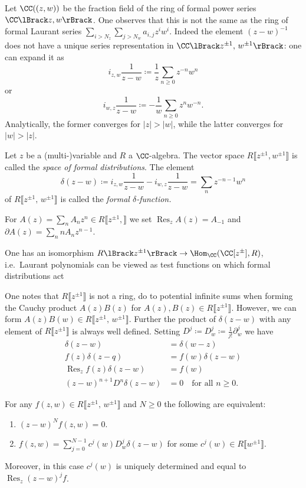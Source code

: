 \documentclass{ck-article}
\DeclareMathOperator\Res{Res}
\renewcommand\lParen{((}
\renewcommand\rParen{))}
\begin{document}
Let $\CC\lParen z,w\rParen$ be the fraction field of the ring of formal power series $\CC\lBrack z,w \rBrack$.
One observes that this is not the same as the ring of formal Laurant series $\sum_{i > N_z}\sum_{j > N_w} a_{i,j} z^iw^i$.
Indeed the element $(z-w)^{-1}$ does not have a unique series representation in $\CC\lBrack z^{\pm1},\, w^{\pm1}\rBrack$: one can expand it as
\[
    i_{z,w}\frac{1}{z-w} \coloneqq \frac1z\sum_{n \ge 0} z^{-n}w^n
\]
or
\[
    i_{w,z}\frac{1}{z-w} \coloneqq -\frac1w\sum_{n \ge 0} z^{n}w^{-n}.
\]
Analytically, the former converges for $|z| > |w|$, while the latter converges for $|w| > |z|$.

\begin{Definition}
    Let $z$ be a (multi-)variable and $R$ a $\CC$-algebra.
    The vector space $R\lBrack z^{\pm1}, w^{\pm1}\rBrack$ is called the \emph{space of formal distributions}.
    The element 
    \[
        \delta(z-w) \coloneqq i_{z,w}\frac{1}{z-w} - i_{w,z}\frac{1}{z-w} = \sum_n z^{-n-1} w^n
    \]
    of 
    $R\lBrack z^{\pm1},\, w^{\pm1}\rBrack$ is called the \emph{formal $\delta$-function.}
\end{Definition}

For $A(z) = \sum_n A_nz^n \in R\lBrack z^{\pm1}, \rBrack$ we set $\Res_z A(z) = A_{-1}$ and $\partial A(z) = \sum_n nA_n z^{n-1}$.

One has an isomorphism $R\lBrack z^{\pm1}\rBrack \to \Hom_\CC(\CC[z^{\pm}], R)$, i.e.~Laurant polynomials can be viewed as test functions on which formal distributions act \cite[Lemma~10.2]{Schottenloher:2008:AMathematicalIntroToCFT}

One notes that $R\lBrack z^{\pm1}\rBrack$ is not a ring, do to potential infinite sums when forming the Cauchy product $A(z)B(z)$ for $A(z), B(z) \in R\lBrack z^{\pm1}\rBrack$.
However, we can form $A(z)B(w) \in R\lBrack z^{\pm1},\, w^{\pm1}\rBrack$.
Further the product of $\delta(z-w)$ with any element of $R\lBrack z^{\pm1}\rBrack$ is always well defined.
Setting $D^j \coloneqq D^j_w \coloneqq \frac{1}{j!} \partial_w^j$ we have
\begin{align*}
    \delta(z-w) & = \delta(w-z) \\
    f(z)\delta(z-q) &= f(w)\delta(z-w) \\
    \Res_z f(z)\delta(z-w) &= f(w) \\
    (z-w)^{n+1} D^n \delta(z-w) & = 0 \quad \text{for all } n \ge 0.
\end{align*}

\begin{Proposition}
    For any $f(z,w) \in R\lBrack z^{\pm1},\, w^{\pm1}\rBrack$ and $N \ge 0$ the following are equivalent:
    \begin{enumerate}
        \item $(z-w)^N f(z,w) = 0$.
        \item $f(z,w) = \sum_{j=0}^{N-1} c^j(w) D_w^j\delta(z-w)$ for some $c^j(w) \in R\lBrack w^{\pm1}\rBrack$.
    \end{enumerate}
    Moreover, in this case $c^j(w)$ is uniquely determined and equal to $\Res_z(z-w)^jf$.
\end{Proposition}
\end{document}
